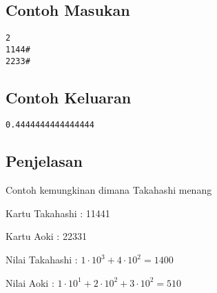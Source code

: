 \documentclass{article}
\begin{document}
\begin{multicols}{2}
\subsection*{Contoh Masukan}
\begin{lstlisting}
2
1144#
2233#
\end{lstlisting}
\columnbreak
\subsection*{Contoh Keluaran}
\begin{lstlisting}
0.4444444444444444
\end{lstlisting}
\vfill
\null
\end{multicols}

\subsection*{Penjelasan}
Contoh kemungkinan dimana Takahashi menang

Kartu Takahashi : 11441

Kartu Aoki : 22331

Nilai Takahashi : $1\cdot 10^3 + 4\cdot10^2 = 1400 $ 

Nilai Aoki : $1\cdot10^1 + 2\cdot10^2 + 3\cdot10^2 = 510$

\pagebreak
\end{document}
